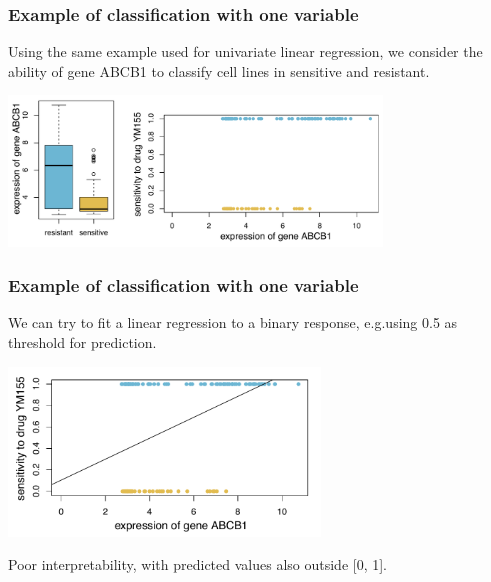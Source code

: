 \documentclass[notes]{beamer}          %
\begin{document}
\begin{frame}
\frametitle{Example of classification with one variable}

Using the same example used for univariate linear regression, we consider the ability of gene ABCB1 to classify cell lines in sensitive and resistant.

\begin{center}
\includegraphics[height=4cm]{../figures/week_2_linear_models/GDSC_one_variable_example_logistic_regression_1.pdf}
\end{center}

\end{frame}

\begin{frame}
\frametitle{Example of classification with one variable}

We can try to fit a linear regression to a binary response, e.g.using 0.5 as threshold for prediction.

\begin{center}
\includegraphics[height=4.5cm]{../figures/week_2_linear_models/GDSC_one_variable_example_logistic_regression_2.pdf}
\end{center}

Poor interpretability, with predicted values also outside [0, 1].

\end{frame}
\end{document}

